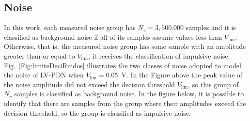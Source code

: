 \documentclass[journal]{IEEEtran}
\begin{document}
\subsection{Noise}\label{sec-ruido}
In this work, each measured noise group has $N_v=3,500.000$ samples and it is classified as background noise if all of its samples assume values less than $V_{\lim}$. Otherwise, that is, the measured noise group has some sample with an amplitude greater than or equal to $V_{\lim}$, it receives the classification of impulsive noise. Fig.~\ref{Fig:limiteDeciRuidos} illustrates the two classes of noise adopted to model the noise of \ac{LV-PDN} when $V_{\lim}=0.05$~V. In the Figure above the peak value of the noise amplitude did not exceed the decision threshold $V_{\lim}$, so this group of $N_v$ samples is classified as background noise. In the figure below, it is possible to identify that there are samples from the group where their amplitudes exceed the decision threshold, so the group is classified as impulsive noise. 
\end{document}
